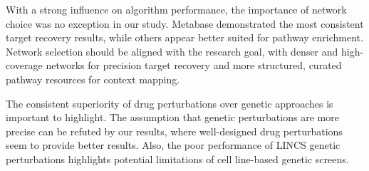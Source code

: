 With a strong influence on algorithm performance, the importance of network choice was no exception in our study. Metabase demonstrated the most consistent target recovery results, while others appear better suited for pathway enrichment. Network selection should be aligned with the research goal, with denser and high-coverage networks for precision target recovery and more structured, curated pathway resources for context mapping.

The consistent superiority of drug perturbations over genetic approaches is important to highlight. The assumption that genetic perturbations are more precise can be refuted by our results, where well-designed drug perturbations seem to provide better results. Also, the poor performance of LINCS genetic perturbations highlights potential limitations of cell line-based genetic screens.

